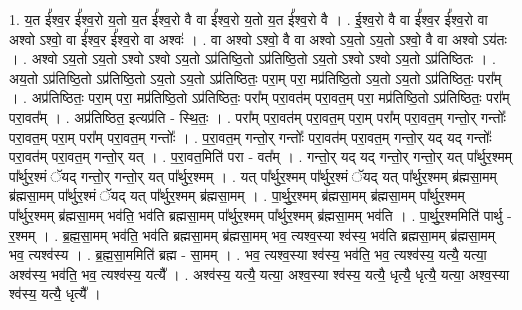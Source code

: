 \documentclass[17pt]{extarticle}
\begin{document}
1. य॒त ई᳚श्व॒र ई᳚श्व॒रो य॒तो य॒त ई᳚श्व॒रो वै वा ई᳚श्व॒रो य॒तो य॒त ई᳚श्व॒रो वै । . ई॒श्व॒रो वै वा ई᳚श्व॒र ई᳚श्व॒रो वा अश्वो ऽश्वो॒ वा ई᳚श्व॒र ई᳚श्व॒रो वा अश्वः॑ । . वा अश्वो ऽश्वो॒ वै वा अश्वो ऽय॒तो ऽय॒तो ऽश्वो॒ वै वा अश्वो ऽय॑तः । . अश्वो ऽय॒तो ऽय॒तो ऽश्वो ऽश्वो ऽय॒तो ऽप्र॑तिष्ठि॒तो ऽप्र॑तिष्ठि॒तो ऽय॒तो ऽश्वो ऽश्वो ऽय॒तो ऽप्र॑तिष्ठितः । . अय॒तो ऽप्र॑तिष्ठि॒तो ऽप्र॑तिष्ठि॒तो ऽय॒तो ऽय॒तो ऽप्र॑तिष्ठितः॒ परा॒म् परा॒ मप्र॑तिष्ठि॒तो ऽय॒तो ऽय॒तो ऽप्र॑तिष्ठितः॒ परा᳚म् । . अप्र॑तिष्ठितः॒ परा॒म् परा॒ मप्र॑तिष्ठि॒तो ऽप्र॑तिष्ठितः॒ परा᳚म् परा॒वत॑म् परा॒वत॒म् परा॒ मप्र॑तिष्ठि॒तो ऽप्र॑तिष्ठितः॒ परा᳚म् परा॒वत᳚म् । . अप्र॑तिष्ठित॒ इत्यप्र॑ति - स्थि॒तः॒ । . परा᳚म् परा॒वत॑म् परा॒वत॒म् परा॒म् परा᳚म् परा॒वत॒म् गन्तो॒र् गन्तोः᳚ परा॒वत॒म् परा॒म् परा᳚म् परा॒वत॒म् गन्तोः᳚ । . प॒रा॒वत॒म् गन्तो॒र् गन्तोः᳚ परा॒वत॑म् परा॒वत॒म् गन्तो॒र् यद् यद् गन्तोः᳚ परा॒वत॑म् परा॒वत॒म् गन्तो॒र् यत् । . प॒रा॒वत॒मिति॑ परा - वत᳚म् । . गन्तो॒र् यद् यद् गन्तो॒र् गन्तो॒र् यत् पा᳚र्थुर॒श्मम् पा᳚र्थुर॒श्मं ॅयद् गन्तो॒र् गन्तो॒र् यत् पा᳚र्थुर॒श्मम् । . यत् पा᳚र्थुर॒श्मम् पा᳚र्थुर॒श्मं ॅयद् यत् पा᳚र्थुर॒श्मम् ब्र॑ह्मसा॒मम् ब्र॑ह्मसा॒मम् पा᳚र्थुर॒श्मं ॅयद् यत् पा᳚र्थुर॒श्मम् ब्र॑ह्मसा॒मम् । . पा॒र्थु॒र॒श्मम् ब्र॑ह्मसा॒मम् ब्र॑ह्मसा॒मम् पा᳚र्थुर॒श्मम् पा᳚र्थुर॒श्मम् ब्र॑ह्मसा॒मम् भव॑ति॒ भव॑ति ब्रह्मसा॒मम् पा᳚र्थुर॒श्मम् पा᳚र्थुर॒श्मम् ब्र॑ह्मसा॒मम् भव॑ति । . पा॒र्थु॒र॒श्ममिति॑ पार्थु - र॒श्मम् । . ब्र॒ह्म॒सा॒मम् भव॑ति॒ भव॑ति ब्रह्मसा॒मम् ब्र॑ह्मसा॒मम् भव॒ त्यश्व॒स्या श्व॑स्य॒ भव॑ति ब्रह्मसा॒मम् ब्र॑ह्मसा॒मम् भव॒ त्यश्व॑स्य । . ब्र॒ह्म॒सा॒ममिति॑ ब्रह्म - सा॒मम् । . भव॒ त्यश्व॒स्या श्व॑स्य॒ भव॑ति॒ भव॒ त्यश्व॑स्य॒ यत्यै॒ यत्या॒ अश्व॑स्य॒ भव॑ति॒ भव॒ त्यश्व॑स्य॒ यत्यै᳚ । . अश्व॑स्य॒ यत्यै॒ यत्या॒ अश्व॒स्या श्व॑स्य॒ यत्यै॒ धृत्यै॒ धृत्यै॒ यत्या॒ अश्व॒स्या श्व॑स्य॒ यत्यै॒ धृत्यै᳚ । \newline
\end{document}
